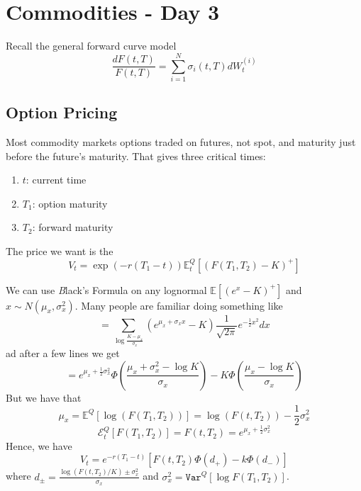 \chapter{Commodities - Day 3}
Recall the general forward curve model
\begin{equation}
	\frac{dF(t,T)}{F(t,T)} = \sum_{i=1}^N \sigma_i(t,T)dW_t^{(i)}
\end{equation}

\section{Option Pricing}
Most commodity markets options traded on futures, not spot, and maturity just before the future's maturity.
That gives three critical times:
\begin{enumerate}
	\item $t$: current time
	\item $T_1$: option maturity
	\item $T_2$: forward maturity
\end{enumerate}
The price we want is the
\begin{equation}
	V_t = \exp(-r(T_1-t)) \mathbb{E}^Q_t \left[ (F(T_1,T_2) - K)^+ \right]
\end{equation}

We can use {\emph Black's Formula} on any lognormal $\mathbb{E}\left[ (e^x-K)^+ \right]$ and $x \sim N(\mu_x, \sigma_x^2)$. 
Many people are familiar doing something like
\begin{equation}
	= \sum_{\log \frac{K-\mu_x}{\sigma_x}} (e^{\mu_x + \sigma_x x} - K)\frac{1}{\sqrt{2\pi}} e^{-\frac12 x^2}dx
\end{equation}
ad after a few lines we get
\begin{equation}
	= e^{\mu_x + \frac12 \sigma_x^2} \Phi\left( \frac{\mu_x + \sigma_x^2 - \log K}{\sigma_x}\right)
			- K \Phi\left(\frac{\mu_x - \log K}{\sigma_x}\right)
\end{equation}
But we have that
\begin{equation}
	\mu_x = \mathbb{E}^Q [\log (F(T_1,T_2))] = \log(F(t,T_2)) - \frac12 \sigma_x^2
\end{equation}
\begin{equation}
	\mathcal{E}_t^Q \left[ F(T_1,T_2) \right] = F(t,T_2) = e^{\mu_x + \frac12 \sigma_x^2}
\end{equation}
Hence, we have
\begin{equation}
	V_t = e^{-r(T_1-t)} \left[ F(t,T_2)\Phi(d_+) - k\Phi(d_-) \right]
\end{equation}
where $d_\pm = \frac{\log (F(t,T_2)/K) \pm \sigma_x^2}{\sigma_x}$ and $\sigma_x^2 = \texttt{Var}^Q\left[ \log F(T_1,T_2)\right]$.

